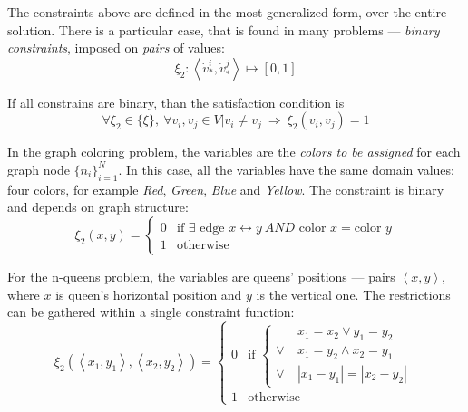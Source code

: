 The constraints above are defined in the most generalized form,
over the entire solution. There is a particular case, that is found in many problems
--- \emph{binary constraints}, imposed on \emph{pairs} of values:
$$\xi_2 : \left< {\dot v}^i_\ast, {\dot v}^j_\ast \right> \mapsto [0,1]$$

If all constrains are binary, than the satisfaction condition is
$$\forall \xi_2     \in \{\xi\},~
  \forall v_i, v_j  \in V | v_i \not= v_j
~ \Rightarrow ~ \xi_2(v_i, v_j) = 1
$$

\medskip

In the graph coloring problem, the variables are the \emph{colors to be assigned}
for each graph node $\{n_i\}_{i=1}^N$. In this case, all the variables have
the same domain values: four colors, for example \textit{Red}, \textit{Green},
\textit{Blue} and \textit{Yellow}. The constraint is binary and depends on graph
structure:
$$ \xi_2(x,y)= \begin{cases}
  0 & \mbox{if } \exists \text{~edge~} x \leftrightarrow y
                ~\mathit{AND} \text{~color~} x = \text{color~} y \\
  1 & \text{otherwise}
\end{cases}
$$


For the n-queens problem, the variables are queens' positions ---
pairs $\left< x,y \right>$, where $x$ is queen's horizontal position and
$y$ is the vertical one. The restrictions can be gathered within a single
constraint function:
$$\xi_2(\left<x_1,y_1\right>, \left<x_2,y_2\right>) =
    \begin{cases}
      0 & \mbox{if } \begin{cases}
                        &      x_1 = x_2  \lor y_1 = y_2 \\
                        \lor~& x_1 = y_2 \land x_2 = y_1 \\
                        \lor~& |x_1-y_1| = |x_2-y_2|
                     \end{cases} \\
     1 & \text{otherwise}
    \end{cases}
$$

\todo{}


